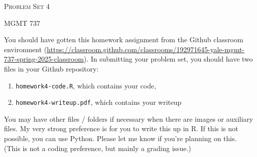 \documentclass[11pt, a4paper]{article}
\begin{document}
\begin{center}
  {\Large \textsc{Problem Set 4}}

  MGMT 737
\end{center}


You should have gotten this homework assignment from the Github classroom environment (\url{https://classroom.github.com/classrooms/192971645-yale-mgmt-737-spring-2025-classroom}). In submitting your problem set, you should have two files in your Github repository:


\begin{enumerate}
  \item \texttt{homework4-code.R}, which contains your code,
  \item \texttt{homework4-writeup.pdf}, which contains your writeup 
\end{enumerate} 

You may have other files / folders if necessary when there are images or auxiliary files. My very strong preference is for you to write this up in R. If this is not possible, you can use Python. Please let me know if you're planning on this. (This is not a coding preference, but mainly a grading issue.)
\end{document}
